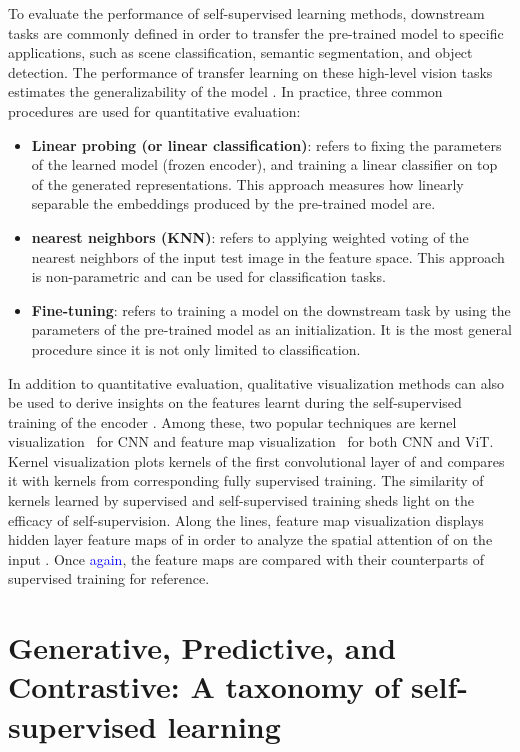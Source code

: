 \documentclass[lettersize,journal]{IEEEtran}
\begin{document}
To evaluate the performance of self-supervised learning methods, downstream tasks are commonly defined in order to transfer the pre-trained model  to specific applications, such as scene classification, semantic segmentation, and object detection. The performance of transfer learning on these high-level vision tasks estimates the generalizability of the model . In practice, three common procedures are used for quantitative evaluation: 
\begin{itemize}
    \item \textbf{Linear probing (or linear classification)}: refers to fixing the parameters of the learned model  (frozen encoder), and training a linear classifier  on top of the generated representations. This approach measures how linearly separable the embeddings produced by the pre-trained model  are.
    \item \textbf{ nearest neighbors (KNN)}: refers to applying weighted voting of the  nearest neighbors of the input test image  in the feature space. This approach is non-parametric and can be used for classification tasks. 
    \item \textbf{Fine-tuning}: refers to training a model on the downstream task by using the parameters of the pre-trained model  as an initialization. It is the most general procedure since it is not only limited to classification.  
\end{itemize}

In addition to quantitative evaluation, qualitative visualization methods can also be used to derive insights on the features learnt during the self-supervised training of the encoder . Among these, two popular techniques are kernel visualization~\cite{gidaris2018unsupervised,noroozi2018boosting,caron2018deep} for CNN and feature map visualization~\cite{gidaris2018unsupervised,caron2021emerging,el2021xcit} for both CNN and ViT. Kernel visualization plots kernels of the first convolutional layer of  and compares it with kernels from corresponding fully supervised training. The similarity of kernels learned by supervised and self-supervised training sheds light on the efficacy of self-supervision. Along the lines, feature map visualization displays hidden layer feature maps of  in order to analyze the spatial attention of  on the input . Once \textcolor{blue}{again}, the feature maps are compared with their counterparts of supervised training for reference. 


\section{Generative, Predictive, and Contrastive: A taxonomy of self-supervised learning}
\end{document}
